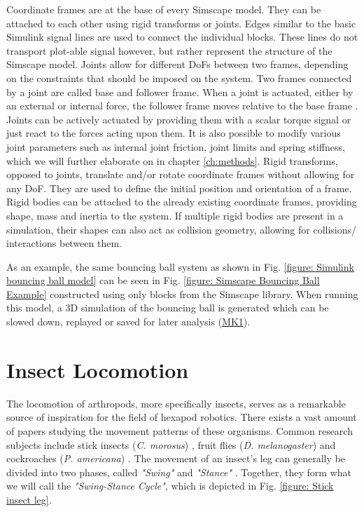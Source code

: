 Coordinate frames are at the base of every Simscape model.
They can be attached to each other using rigid transforms or joints.
Edges similar to the basic Simulink signal lines are used to connect the individual blocks.
These lines do not transport plot-able signal however, but rather represent the structure of the Simscape model.
Joints allow for different DoFs between two frames, depending on the constraints that should be imposed on the system.
Two frames connected by a joint are called base and follower frame.
When a joint is actuated, either by an external or internal force, the follower frame moves relative to the base frame \parencite{thilderkvist2015motion}.
Joints can be actively actuated by providing them with a scalar torque signal or just react to the forces acting upon them.
It is also possible to modify various joint parameters such as internal joint friction, joint limits and spring stiffness, which we will further elaborate on in chapter \ref{ch:methods}.
Rigid transforms, opposed to joints, translate and/or rotate coordinate frames without allowing for any DoF.
They are used to define the initial position and orientation of a frame.
Rigid bodies can be attached to the already existing coordinate frames, providing shape, mass and inertia to the system.
If multiple rigid bodies are present in a simulation, their shapes can also act as collision geometry, allowing for collisions/ interactions between them.

As an example, the same bouncing ball system as shown in Fig. \ref{figure: Simulink bouncing ball model} can be seen in Fig. \ref{figure: Simscape Bouncing Ball Example} constructed using only blocks from the Simscape library. When running this model, a 3D simulation of the bouncing ball is generated which can be slowed down, replayed or saved for later analysis (\hyperref[vid: MK1]{MK1}).

\section{Insect Locomotion}
The locomotion of arthropods, more specifically insects, serves as a remarkable source of inspiration for the field of hexapod robotics.
There exists a vast amount of papers studying the movement patterns of these organisms.
Common research subjects include stick insects (\textit{C. morosus}) \parencite{cruse1990mechanisms}, fruit flies (\textit{D. melanogaster}) \parencite{strauss1990coordination} and cockroaches (\textit{P. americana}) \parencite{delcomyn1971locomotion}. 
The movement of an insect's leg can generally be divided into two phases, called \emph{"Swing"} and \emph{"Stance"} \parencite{schilling2013walknet}.
Together, they form what we will call the \emph{"Swing-Stance Cycle"}, which is depicted in Fig. \ref{figure: Stick insect leg}.


